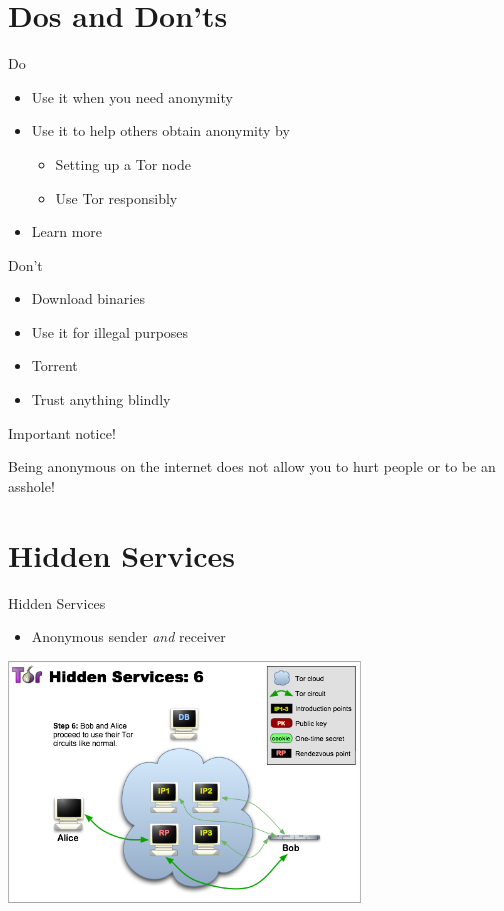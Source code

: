 \documentclass{beamer}
\begin{document}
\section{Dos and Don'ts}
\begin{frame}
	\begin{block}{Do}
		\begin{itemize}
			\item Use it when you need anonymity
			\item Use it to help others obtain anonymity by
				\begin{itemize}
					\item Setting up a Tor node
					\item Use Tor responsibly
				\end{itemize}
			\item Learn more
		\end{itemize}
	\end{block}

	\begin{block}{Don't}
		\begin{itemize}
			\item Download binaries
			\item Use it for illegal purposes
			\item Torrent
			\item Trust anything blindly
		\end{itemize}
	\end{block}
\end{frame}

\begin{frame}{Important notice!}
	\begin{center}
		\huge{Being anonymous on the internet does not allow you to hurt people or to be an asshole!}
	\end{center}
\end{frame}

\section{Hidden Services}
	\begin{frame}{Hidden Services}
		\begin{itemize}
			\item Anonymous sender \textit{and} receiver
		\end{itemize}
		\begin{center}
			\includegraphics[width=0.7\textwidth]{THS-6.png}
		\end{center}
	\end{frame}
\end{document}
